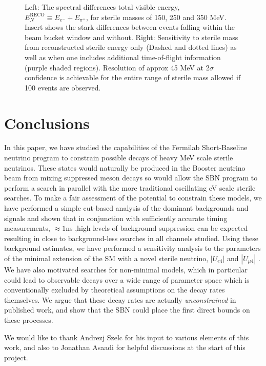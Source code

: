 \documentclass[11pt, a4paper]{article}
\begin{document}
\begin{figure}[t]
\caption{\label{fig:tof_scatter}Left: The spectral differences total visible energy, $E_N^\text{RECO} \equiv E_{e^-}+E_{\pi^+}$, for sterile masses of 150, 250 and 350 MeV. Insert shows the stark differences between events falling within the beam bucket window and without.  Right: Sensitivity to sterile mass from reconstructed sterile energy only (Dashed and dotted lines) as well as when one includes additional time-of-flight information (purple shaded regions). Resolution of approx 45 MeV at 2$\sigma$ confidence is achievable for the entire range of sterile mass allowed if 100 events are observed. }

\end{figure}



\section{\label{sec:conclusions}Conclusions}

In this paper, we have studied the capabilities of the Fermilab Short-Baseline
neutrino program to constrain possible decays of heavy MeV scale sterile neutrinos. These states would naturally be produced in the Booster neutrino beam from mixing suppressed meson decays so would allow the SBN program to perform a search in parallel with the more traditional oscillating eV scale sterile searches. To make a fair assessment of the potential to constrain these models, we have performed a simple cut-based analysis of the dominant
backgrounds and signals and shown that in conjunction with sufficiently accurate timing
measurements, $\approx 1$ns ,high levels of background suppression can be expected resulting in
close to background-less searches in all channels studied. Using these
background estimates, we have performed a sensitivity analysis to the
parameters of the minimal extension of the SM with a novel sterile neutrino, $|U_{e4}|$ and $|U_{\mu4}|$ .
We have also motivated searches for non-minimal models, which in
particular could lead to observable decays over a wide range of parameter space
which is conventionally excluded by theoretical assumptions on the decay rates
themselves. We argue that these decay rates are actually \emph{unconstrained}
in published work, and show that the SBN could place the first direct bounds on
these processes. 

\acknowledgments

We would like to thank Andrezj Szelc for his input to various elements of this
work, and also to Jonathan Asaadi for helpful discussions at the start of this
project.
\end{document}
